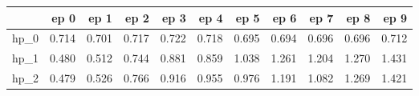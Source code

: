 \begin{tabular}{lrrrrrrrrrr}
\toprule
{} &   ep 0 &   ep 1 &   ep 2 &   ep 3 &   ep 4 &   ep 5 &   ep 6 &   ep 7 &   ep 8 &   ep 9 \\
\midrule
hp\_0 &  0.714 &  0.701 &  0.717 &  0.722 &  0.718 &  0.695 &  0.694 &  0.696 &  0.696 &  0.712 \\
hp\_1 &  0.480 &  0.512 &  0.744 &  0.881 &  0.859 &  1.038 &  1.261 &  1.204 &  1.270 &  1.431 \\
hp\_2 &  0.479 &  0.526 &  0.766 &  0.916 &  0.955 &  0.976 &  1.191 &  1.082 &  1.269 &  1.421 \\
\bottomrule
\end{tabular}
